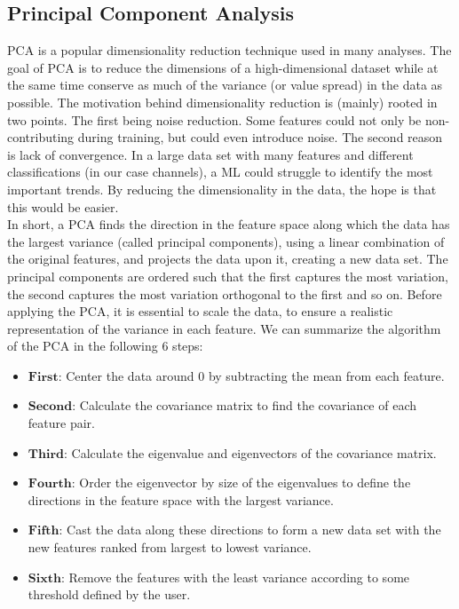 \subsection{Principal Component Analysis}\label{subsec:PCA}
\ac{PCA} is a popular dimensionality reduction technique used in many analyses. The goal of
\ac{PCA} is to reduce the dimensions of a high-dimensional dataset while at the same time conserve as 
much of the variance (or value spread) in the data as possible. The motivation behind dimensionality reduction 
is (mainly) rooted in two points. The first being noise reduction. Some features could not only be non-contributing 
during training, but could even introduce noise. The second reason is lack of convergence. In a large 
data set with many features and different classifications (in our case channels), a \ac{ML} could struggle
to identify the most important trends. By reducing the dimensionality in the data, the hope is that this 
would be easier. 
\\
In short, a \ac{PCA} finds the direction in the feature space along which the data has the largest 
variance (called principal components), using a linear combination of the original features, and projects the
data upon it, creating a new data set. The principal components are ordered such that the first captures the most variation,
the second captures the most variation orthogonal to the first and so on. Before applying the \ac{PCA}, it is essential to 
scale the data, to ensure a realistic representation of the variance in each feature.  We can summarize the algorithm of the \ac{PCA} in 
the following 6 steps:
\begin{itemize}
    \item $\textbf{First}$: Center the data around 0 by subtracting the mean from each feature.
    \item $\textbf{Second}$: Calculate the covariance matrix to find the covariance 
                             of each feature pair.
    \item $\textbf{Third}$: Calculate the eigenvalue and eigenvectors of the covariance matrix.
    \item $\textbf{Fourth}$: Order the eigenvector by size of the eigenvalues to define the directions 
                             in the feature space with the largest variance.
    \item $\textbf{Fifth}$: Cast the data along these directions to form a new data set with 
                             the new features ranked from largest to lowest variance.
    \item $\textbf{Sixth}$: Remove the features with the least variance according to some threshold
                            defined by the user.                      
\end{itemize}
